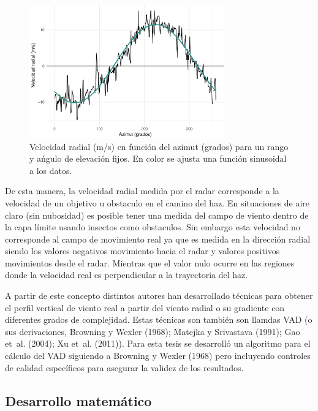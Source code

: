 \documentclass[12pt,spanish,oneside]{book}
\begin{document}
\begin{figure}

{\centering \includegraphics[width=0.75\textwidth]{Tesis_files/figure-latex/vad-1} 

}

\caption{Velocidad radial (m/s) en función del azimut (grados) para un rango y ańgulo de elevación fijos. En color se  ajusta una función sinusoidal a los datos. \label{vad}}\label{fig:vad}
\end{figure}

De esta manera, la velocidad radial medida por el radar corresponde a la
velocidad de un objetivo u obstaculo en el camino del haz. En
situaciones de aire claro (sin nubosidad) es posible tener una medida
del campo de viento dentro de la capa límite usando insectos como
obstaculos. Sin embargo esta velocidad no corresponde al campo de
movimiento real ya que es medida en la dirección radial siendo los
valores negativos movimiento hacia el radar y valores positivos
movimientos desde el radar. Mientras que el valor nulo ocurre en las
regiones donde la velocidad real es perpendicular a la trayectoria del
haz.

A partir de este concepto distintos autores han desarrollado técnicas
para obtener el perfil vertical de viento real a partir del viento
radial o su gradiente con diferentes grados de complejidad. Estas
técnicas son también son llamdas VAD (o sus derivaciones, Browning y
Wexler (1968); Matejka y Srivastava (1991); Gao et~al. (2004); Xu et~al.
(2011)). Para esta tesis se desarrolló un algoritmo para el cálculo del
VAD siguiendo a Browning y Wexler (1968) pero incluyendo controles de
calidad específicos para asegurar la validez de los resultados.

\subsection{Desarrollo matemático}\label{desarrollo-matematico}
\end{document}
